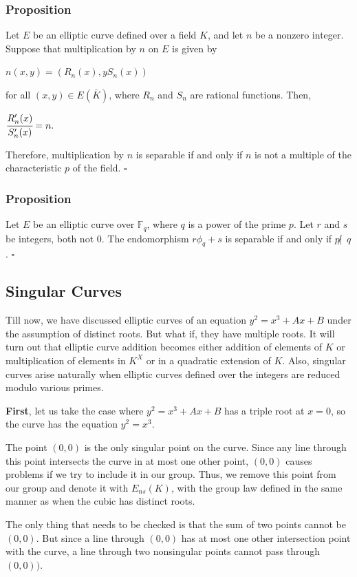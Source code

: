 \documentclass[a4paper, 12pt]{article}
\begin{document}
\subsubsection{Proposition}
Let $E$ be an elliptic curve defined over a field $K$, and let $n$ be a nonzero integer. Suppose that multiplication by $n$ on $E$ is given by 
\begin{center} $n(x,y)=(R_n(x),yS_n(x))$ \end{center}
for all $(x,y) \in E(\bar{K})$, where $R_n$ and $S_n$ are rational functions. Then,
\begin{center} $\cfrac{R_n'(x)}{S_n'(x)} = n.$ \end{center}
Therefore, multiplication by $n$ is separable if and only if $n$ is not a multiple of the characteristic $p$ of the field. $\square$
\subsubsection{Proposition}
Let $E$ be an elliptic curve over $\mathbb{F}_q$, where $q$ is a power of the prime $p$. Let $r$ and $s$ be integers, both not 0. The endomorphism $r\phi_q+s$ is separable if and only if $p\not | \:\: q$. $\square$
\subsection {Singular Curves}
Till now, we have discussed elliptic curves of an equation $y^2=x^3+Ax+B$ under the assumption of distinct roots. But what if, they have multiple roots. It will turn out that elliptic curve addition becomes either addition of elements of $K$ or multiplication of elements in $K^X$ or in a quadratic extension of $K$. Also, singular curves arise naturally when elliptic curves defined over the integers are reduced modulo various primes. \par
\textbf{First}, let us take the case where $y^2=x^3+Ax+B$ has a triple root at $x=0$, so the curve has the equation $y^2=x^3$.\par
The point $(0,0)$ is the only singular point on the curve. Since any line through this point intersects the curve in at most one other point, $(0,0)$ causes problems if we try to include it in our group. Thus, we remove this point from our group and denote it with $E_{ns}(K)$, with the group law defined in the same manner as when the cubic has distinct roots.  \par
The only thing that needs to be checked is that the sum of two points cannot be $(0,0)$. But since a line through $(0,0)$ has at most one other intersection point with the curve, a line through two nonsingular points cannot pass through $(0,0))$. 
\end{document}
